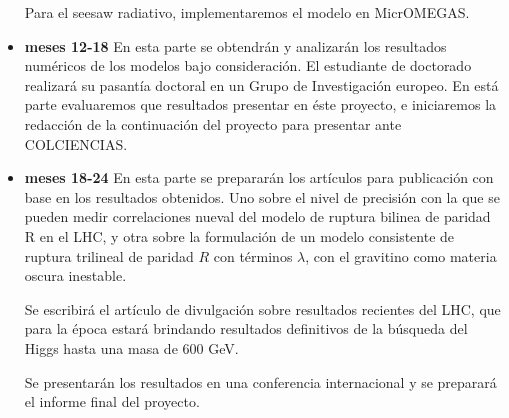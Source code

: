 \begin{itemize}
\begin{evaluador}
  \begin{darkmatter}
\begin{proyecto}
  Para el seesaw radiativo, implementaremos el modelo en MicrOMEGAS.
\end{proyecto}
\end{darkmatter}
\end{evaluador}

\item \textbf{meses 12-18} En esta parte se obtendrán y analizarán los
  resultados numéricos de los modelos bajo consideración. El
  estudiante de doctorado realizará su pasantía doctoral en un Grupo
  de Investigación europeo. En está parte evaluaremos que resultados
  presentar en éste proyecto, e iniciaremos la redacción de la
  continuación del proyecto para presentar ante COLCIENCIAS. 

\item \textbf{meses 18-24} En esta parte se prepararán los artículos
  para publicación con base en los resultados obtenidos. Uno sobre el
  nivel de precisión con la que se pueden medir correlaciones nueval
  del modelo de ruptura bilinea de paridad R en el LHC, y otra sobre
  la formulación de un modelo consistente de ruptura trilineal de
  paridad $R$ con términos $\lambda$, con el gravitino como materia
  oscura inestable.


  Se escribirá el artículo de divulgación sobre resultados recientes
  del LHC, que para la época estará brindando resultados definitivos
  de la búsqueda del Higgs hasta una masa de 600 GeV.

  Se presentarán los resultados en una conferencia internacional y se
  preparará el informe final del proyecto.
\end{itemize}

